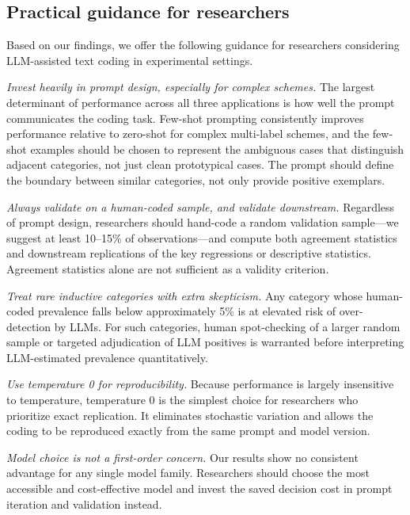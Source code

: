 \documentclass[11pt]{article}
\begin{document}
\begin{sloppypar}
\subsection*{Practical guidance for researchers}

Based on our findings, we offer the following guidance for researchers considering LLM-assisted text coding in experimental settings.

\textit{Invest heavily in prompt design, especially for complex schemes.} The largest determinant of performance across all three applications is how well the prompt communicates the coding task. Few-shot prompting consistently improves performance relative to zero-shot for complex multi-label schemes, and the few-shot examples should be chosen to represent the ambiguous cases that distinguish adjacent categories, not just clean prototypical cases. The prompt should define the boundary between similar categories, not only provide positive exemplars.

\textit{Always validate on a human-coded sample, and validate downstream.} Regardless of prompt design, researchers should hand-code a random validation sample---we suggest at least 10--15\% of observations---and compute both agreement statistics and downstream replications of the key regressions or descriptive statistics. Agreement statistics alone are not sufficient as a validity criterion.

\textit{Treat rare inductive categories with extra skepticism.} Any category whose human-coded prevalence falls below approximately 5\% is at elevated risk of over-detection by LLMs. For such categories, human spot-checking of a larger random sample or targeted adjudication of LLM positives is warranted before interpreting LLM-estimated prevalence quantitatively.

\textit{Use temperature 0 for reproducibility.} Because performance is largely insensitive to temperature, temperature 0 is the simplest choice for researchers who prioritize exact replication. It eliminates stochastic variation and allows the coding to be reproduced exactly from the same prompt and model version.

\textit{Model choice is not a first-order concern.} Our results show no consistent advantage for any single model family. Researchers should choose the most accessible and cost-effective model and invest the saved decision cost in prompt iteration and validation instead.



\end{sloppypar}
\end{document}
